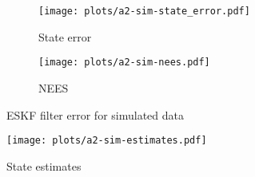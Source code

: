 \begin{figure}
    \centering
    \begin{adjustbox}{minipage=1.1\linewidth, scale=1}
        \begin{subfigure}{.5\textwidth}
            \texttt{[image: plots/a2-sim-state\_error.pdf]} 
            \caption{State error}
            \label{fig:a2-sim-state_error}
        \end{subfigure}
        \begin{subfigure}{.5\textwidth}
            \texttt{[image: plots/a2-sim-nees.pdf]} 
            \caption{NEES}
            \label{fig:a2-sim-nees}
        \end{subfigure}
    \end{adjustbox}
        \caption{ESKF filter error for simulated data}
        \label{fig:a2-sim-error_NEES}
\end{figure}
\begin{figure}
    \centering
    \texttt{[image: plots/a2-sim-estimates.pdf]} 
    \caption{State estimates}
    \label{fig:a2-sim-estimates}
\end{figure}

 
